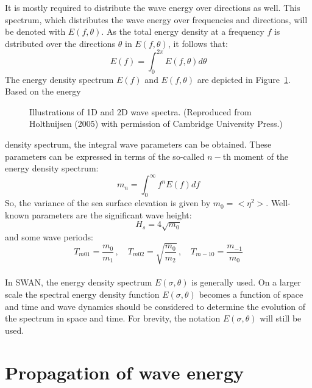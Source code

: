\documentclass[12pt]{book}
\begin{document}
It is mostly required to distribute the wave energy over directions as well. This spectrum, which distributes
the wave energy over frequencies and directions, will be denoted with $E(f,\theta)$. As the total energy
density at a frequency $f$ is dstributed over the directions $\theta$ in $E(f,\theta)$, it follows that:
\begin{equation}
  E(f) = \int_{0}^{2\pi} E(f,\theta) d \theta
  \label{intro8}
\end{equation}
The energy density spectrum $E(f)$ and $E(f,\theta)$ are depicted in Figure~\ref{fig:spectra}. Based on the energy
\begin{figure}[htb]
   \centerline{
              }
      \caption{Illustrations of 1D and 2D wave spectra. (Reproduced from Holthuijsen (2005) with permission of
               Cambridge University Press.)}
      \label{fig:spectra}
\end{figure}
density spectrum, the integral wave parameters can be obtained. These parameters can be expressed in terms of the so-called
$n-$th moment of the energy density spectrum:
\begin{equation}
  m_n = \int_{0}^{\infty} f^n E(f) df
  \label{intro8-1}
\end{equation}
So, the variance of the sea surface elevation is given by $m_0 = <\eta^2>$. Well-known parameters are the significant
wave height:
\begin{equation}
  H_s = 4 \sqrt{m_0}
\end{equation}
and some wave periods:
\begin{equation}
  T_{m01} = \frac{m_0}{m_1}\, , \quad
  T_{m02} = \sqrt{\frac{m_0}{m_2}}\, , \quad
  T_{m-10} = \frac{m_{-1}}{m_0}
\end{equation}
\\[2ex]
\noindent
In SWAN, the energy density spectrum $E(\sigma,\theta)$ is generally used. On a larger scale the spectral energy density
function $E(\sigma,\theta)$ becomes a function of space and time and wave dynamics should be considered to determine
the evolution of the spectrum in space and time. For brevity, the notation $E(\sigma,\theta)$ will still be used.
\nocite{Hol05}

\section{Propagation of wave energy}
\end{document}
